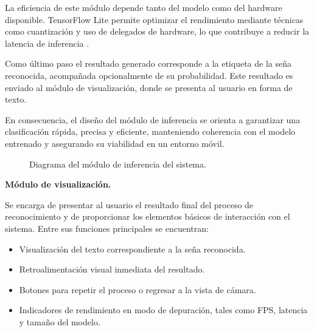 	La eficiencia de este módulo depende tanto del modelo como del hardware disponible. TensorFlow Lite permite optimizar el rendimiento mediante técnicas como cuantización y uso de delegados de hardware, lo que contribuye a reducir la latencia de inferencia \cite{tflite}.
	
	Como último paso el resultado generado corresponde a la etiqueta de la seña reconocida, acompañada opcionalmente de su probabilidad. Este resultado es enviado al módulo de visualización, donde se presenta al usuario en forma de texto.
	
	En consecuencia, el diseño del módulo de inferencia se orienta a garantizar una clasificación rápida, precisa y eficiente, manteniendo coherencia con el modelo entrenado y asegurando su viabilidad en un entorno móvil.
	
	\begin{figure}[H]
		\centering
		\caption{Diagrama del módulo de inferencia del sistema.}
		\label{fig:inferencia}
	\end{figure}
	
	\textbf{Módulo de visualización.}  
	
	Se encarga de presentar al usuario el resultado final del proceso de reconocimiento y de proporcionar los elementos básicos de interacción con el sistema. Entre sus funciones principales se encuentran:
	\begin{itemize}
		\item Visualización del texto correspondiente a la seña reconocida.
		\item Retroalimentación visual inmediata del resultado.
		\item Botones para repetir el proceso o regresar a la vista de cámara.
		\item Indicadores de rendimiento en modo de depuración, tales como FPS, latencia y tamaño del modelo.
	\end{itemize}
	

